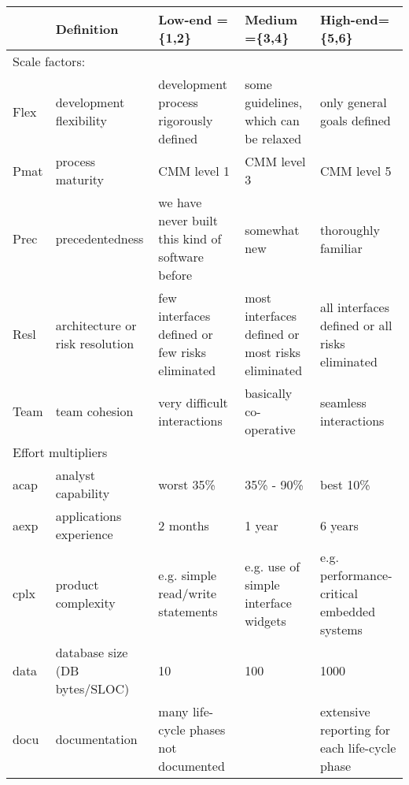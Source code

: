 

 \begin{figure*}
\begin{changed}

{\scriptsize
\begin{center}
\begin{tabular}{|p{0.5in}|p{1.4in}|p{1.3in}|p{1.3in}|p{1.3in}|}\hline

 & Definition & Low-end = \{1,2\}
 &Medium =\{3,4\} &High-end= \{5,6\} \\\hline


\multicolumn{5}{l}{Scale factors:}\\\hline
Flex   &  development flexibility   & development process
rigorously defined & some guidelines, which can be relaxed & only
general goals defined\\\hline

Pmat    & process maturity  &  CMM level 1 &   CMM level 3  &  CMM level 5 \\\hline

Prec & precedentedness  &  we have never built this kind
of software before &    somewhat new &
thoroughly familiar \\\hline

Resl &  architecture or risk resolution  &  few interfaces
defined or few risks eliminated  &  most interfaces defined or most
risks eliminated   & all interfaces defined or all risks
eliminated\\\hline

Team  &   team cohesion  &  very difficult interactions &
basically co-operative  &  seamless interactions\\\hline


\multicolumn{5}{l}{Effort multipliers}\\\hline
acap  &  analyst capability  &  worst 35\% &   35\% - 90\% &  best 10\% \\\hline

aexp   &  applications experience  &  2 months &   1 year  &  6 years\\\hline

cplx   &  product complexity   & e.g. simple read/write
statements & e.g. use of simple interface widgets  &  e.g.
performance-critical embedded systems\\\hline

data   &  database size 
(DB bytes/SLOC) &
10 & 100 &    1000 \\\hline

docu   &  documentation   & many life-cycle phases not
documented      & &  extensive reporting for each life-cycle phase\\\hline


\end{tabular}
\end{center}}
\end{changed}
\end{figure*}
